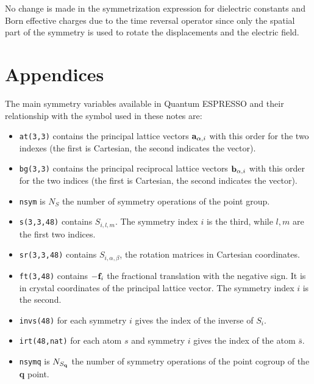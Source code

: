 \documentclass[12pt,a4paper,twoside]{report}
\begin{document}
No change is made in the symmetrization expression for dielectric constants and Born effective charges due to the
time reversal operator since only the spatial part of the symmetry is used to rotate the displacements and the electric field. 

\newpage
{\color{dark-blue}\chapter{Appendices}}
\color{black}
The main symmetry variables available in Quantum ESPRESSO and their relationship with the symbol used in these notes are:

\begin{itemize}

\item
\texttt{at(3,3)} contains the principal lattice vectors ${\bf a}_{\alpha,i}$ with this order for the two indexes (the first is Cartesian, the second indicates the vector). 

\item
\texttt{bg(3,3)} contains the principal reciprocal lattice vectors ${\bf b}_{\alpha,i}$ with this order for the two indices (the first is Cartesian, the second indicates the vector).

\item 
\texttt{nsym} is $N_S$ the number of symmetry operations of the point group.

\item
\texttt{s(3,3,48)} contains $S_{i,l,m}$. The symmetry index $i$ is the third, while $l,m$ are the first two indices.

\item
\texttt{sr(3,3,48)} contains $S_{i,\alpha,\beta}$, the rotation matrices in Cartesian coordinates.

\item
\texttt{ft(3,48)} contains $-{\bf f}_i$ the fractional translation with the negative sign.
It is in crystal coordinates of the principal lattice vector. The symmetry index $i$ is the second.

\item
\texttt{invs(48)} for each symmetry $i$ gives the index of the inverse of $S_i$.

\item
\texttt{irt(48,nat)} for each atom $s$ and symmetry $i$ gives the index of the atom $\bar s$.

\item 
\texttt{nsymq} is $N_{S_{\bf q}}$ the number of symmetry operations of the point cogroup of the
{\bf q} point.


\end{itemize}
\end{document}
